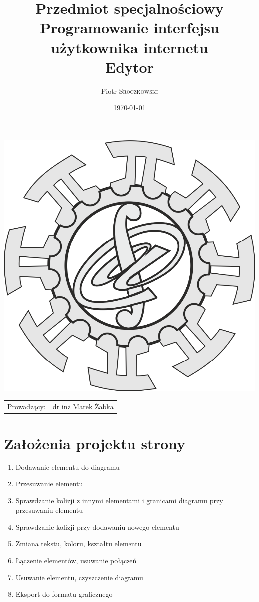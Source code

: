\documentclass{article}
\title{Przedmiot specjalnościowy\\ Programowanie interfejsu użytkownika internetu\\ Edytor } %
\author{Piotr \textsc{Sroczkowski}} %
\date{\today} %
\begin{document}
\maketitle %


\begin{center}
\includegraphics{logo.png}
\begin{tabular}{l r}
Prowadzący: & dr inż Marek Żabka %
\end{tabular}
\end{center}

\pagebreak




\section{Założenia projektu strony}
\begin{enumerate}
    \item Dodawanie elementu do diagramu
    \item Przesuwanie elementu
    \item Sprawdzanie kolizji z innymi elementami i granicami diagramu przy przesuwaniu elementu
    \item Sprawdzanie kolizji przy dodawaniu nowego elementu
    \item Zmiana tekstu, koloru, kształtu elementu
    \item Łączenie elementów, usuwanie połączeń
    \item Usuwanie elementu, czyszczenie diagramu
    \item Eksport do formatu graficznego
\end{enumerate}
\end{document}
